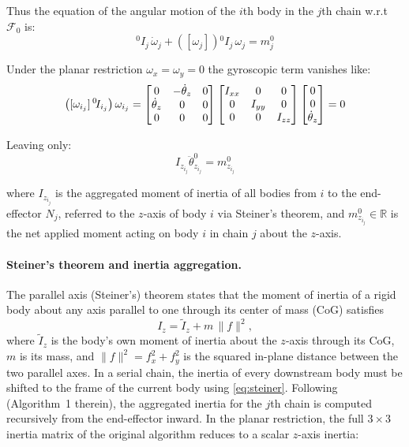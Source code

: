Thus the equation of the angular motion of the $i$th body in the $j$th chain w.r.t $\mathcal{F}_{0}$ is:
\begin{equation}
    {}^{0}\!I_j \, \dot{\omega}_j + \left( [\omega_j] \right) {}^{0}\!I_j \, \omega_j  = m_j^0
\end{equation}

Under the planar restriction $\omega_x = \omega_y = 0$ the gyroscopic term vanishes like:
\begin{equation}
    \left([\omega_{i_j}]\,{}^0\!I_{i_j}\right)\omega_{i_j}
    =
    \begin{bmatrix}
        0 & -\dot{\theta}_z & 0 \\
        \dot{\theta}_z & 0 & 0 \\
        0 & 0 & 0
    \end{bmatrix}
    \begin{bmatrix}
        I_{xx} & 0 & 0 \\
        0 & I_{yy} & 0 \\
        0 & 0 & I_{zz}
    \end{bmatrix}
    \begin{bmatrix}
        0 \\
        0 \\
        \dot{\theta}_z
    \end{bmatrix}
    = 0
    \notag
\end{equation}

Leaving only:
\begin{equation}
    I_{z_{i_j}}\ddot{\theta}^{0}_{z_{i_j}} = m^0_{z_{i_j}}
\end{equation}

where $I_{z_{i_j}}$ is the aggregated moment of inertia of all bodies from $i$ to the end-effector $N_j$, referred to the $z$-axis of body $i$ via Steiner's theorem, and $m^0_{z_{i_j}} \in \mathbb{R}$ is the net applied moment acting on body $i$ in chain $j$ about the $z$-axis.

\paragraph{Steiner's theorem and inertia aggregation.}
The parallel axis (Steiner's) theorem states that the moment of inertia of a rigid body about any axis parallel to one through its center of mass (CoG) satisfies
\begin{equation} \label{eq:steiner}
    I_z = \tilde{I}_z + m\,\|f\|^2,
\end{equation}
where $\tilde{I}_z$ is the body's own moment of inertia about the $z$-axis through its CoG, $m$ is its mass, and $\|f\|^2 = f_x^2 + f_y^2$ is the squared in-plane distance between the two parallel axes. In a serial chain, the inertia of every downstream body must be shifted to the frame of the current body using \eqref{eq:steiner}. Following \cite{Al-Rawashdeh2022_Caracterization} (Algorithm~1 therein), the aggregated inertia for the $j$th chain is computed recursively from the end-effector inward. In the planar restriction, the full $3\times3$ inertia matrix of the original algorithm reduces to a scalar $z$-axis inertia:

